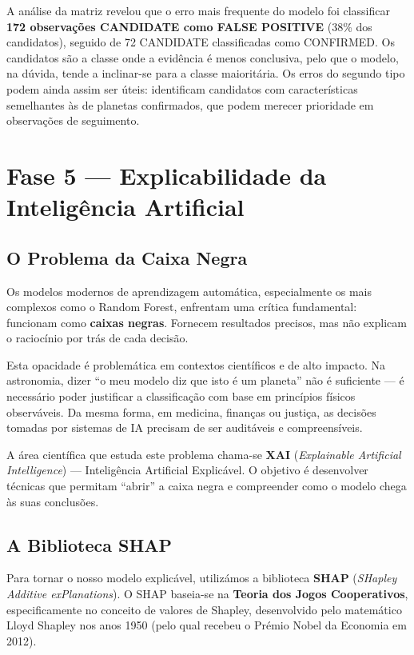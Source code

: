 \documentclass[12pt, a4paper]{report}
\begin{document}
A análise da matriz revelou que o erro mais frequente do modelo foi classificar \textbf{172 observações CANDIDATE como FALSE POSITIVE} (38\% dos candidatos), seguido de 72 CANDIDATE classificadas como CONFIRMED. Os candidatos são a classe onde a evidência é menos conclusiva, pelo que o modelo, na dúvida, tende a inclinar-se para a classe maioritária. Os erros do segundo tipo podem ainda assim ser úteis: identificam candidatos com características semelhantes às de planetas confirmados, que podem merecer prioridade em observações de seguimento.

\chapter{Fase 5 — Explicabilidade da Inteligência Artificial}

\section{O Problema da Caixa Negra}

Os modelos modernos de aprendizagem automática, especialmente os mais complexos como o Random Forest, enfrentam uma crítica fundamental: funcionam como \textbf{caixas negras}. Fornecem resultados precisos, mas não explicam o raciocínio por trás de cada decisão.

Esta opacidade é problemática em contextos científicos e de alto impacto. Na astronomia, dizer ``o meu modelo diz que isto é um planeta'' não é suficiente — é necessário poder justificar a classificação com base em princípios físicos observáveis. Da mesma forma, em medicina, finanças ou justiça, as decisões tomadas por sistemas de IA precisam de ser auditáveis e compreensíveis.

A área científica que estuda este problema chama-se \textbf{XAI} (\textit{Explainable Artificial Intelligence}) — Inteligência Artificial Explicável. O objetivo é desenvolver técnicas que permitam ``abrir'' a caixa negra e compreender como o modelo chega às suas conclusões.

\section{A Biblioteca SHAP}

Para tornar o nosso modelo explicável, utilizámos a biblioteca \textbf{SHAP} (\textit{SHapley Additive exPlanations}). O SHAP baseia-se na \textbf{Teoria dos Jogos Cooperativos}, especificamente no conceito de valores de Shapley, desenvolvido pelo matemático Lloyd Shapley nos anos 1950 (pelo qual recebeu o Prémio Nobel da Economia em 2012).
\end{document}
